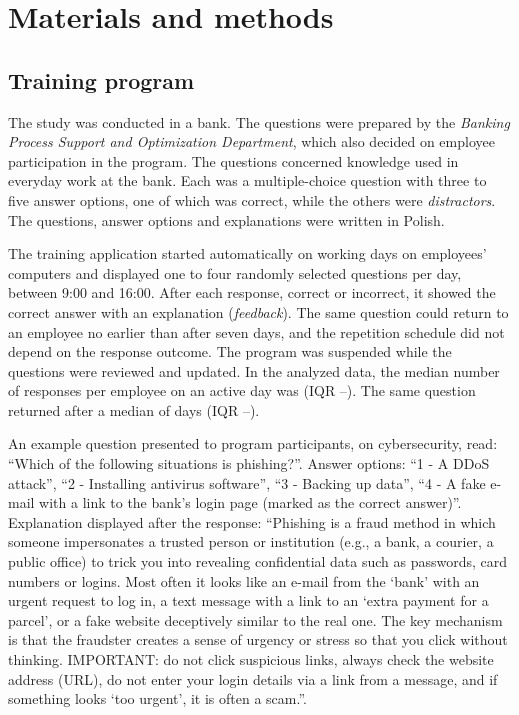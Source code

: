\section{Materials and methods}

\subsection{Training program}
The study was conducted in a bank. The questions were prepared by the \textit{Banking Process Support
and Optimization Department}, which also decided on employee participation in the program. The
questions concerned knowledge used in everyday work at the bank. Each was a multiple-choice question
with three to five answer options, one of which was correct, while the others were
\emph{distractors}. The questions, answer options and explanations were written in Polish.

The training application started automatically on working days on employees' computers and displayed
one to four randomly selected questions per day, between 9:00 and 16:00. After each response, correct
or incorrect, it showed the correct answer with an explanation (\emph{feedback}). The same question
could return to an employee no earlier than after seven days, and the repetition schedule did not
depend on the response outcome. The program was suspended while the questions were reviewed and
updated. In the analyzed data, the median number of responses per employee on an active day was
\DailyMedian{} (IQR \DailyQOne--\DailyQThree). The same question returned after a median of
\GapMedian{} days (IQR \GapQOne--\GapQThree).

An example question presented to program participants, on cybersecurity, read:
``Which of the following situations is phishing?''. Answer options:
``1 - A DDoS attack'',
``2 - Installing antivirus software'',
``3 - Backing up data'',
``4 - A fake e-mail with a link to the bank's login page (marked as the correct answer)''.
Explanation displayed after the response:
``Phishing is a fraud method in which someone impersonates a trusted person or institution (e.g., a bank, a courier, a public office) to trick you into revealing confidential data such as passwords, card numbers or logins. Most often it looks like an e-mail from the `bank' with an urgent request to log in, a text message with a link to an `extra payment for a parcel', or a fake website deceptively similar to the real one. The key mechanism is that the fraudster creates a sense of urgency or stress so that you click without thinking. IMPORTANT: do not click suspicious links, always check the website address (URL), do not enter your login details via a link from a message, and if something looks `too urgent', it is often a scam.''.

